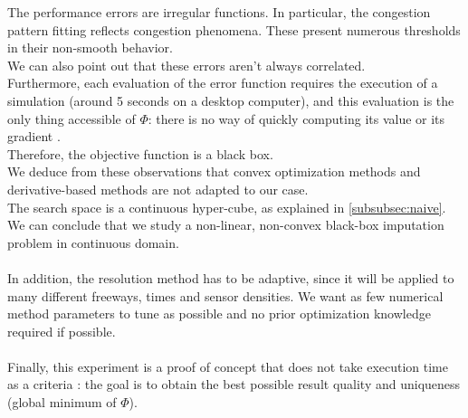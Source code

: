 
The performance errors are irregular functions. In particular, the congestion pattern fitting reflects congestion phenomena. These present numerous thresholds in their non-smooth behavior.\\
We can also point out that these errors aren't always correlated.\\
Furthermore, each evaluation of the error function requires the execution of a simulation (around 5 seconds on a desktop computer), and this evaluation is the only thing accessible of $\Phi$: there is no way of quickly computing its value or its gradient .\\
Therefore, the objective function is a black box.\\
We deduce from these observations that convex optimization methods and derivative-based methods are not adapted to our case.\\
The search space is a continuous hyper-cube, as explained in \ref{subsubsec:naive}.\\
We can conclude that we study a non-linear, non-convex black-box imputation problem in continuous domain.\\
\\ 	
In addition, the resolution method has to be adaptive, since it will be applied to many different freeways, times and sensor densities. We want as few numerical method parameters to tune as possible and  no prior optimization knowledge required if possible.\\
\\
Finally, this experiment is a proof of concept that does not take execution time as a criteria : the goal is to obtain the best possible result quality and uniqueness (global minimum of $\Phi$).
